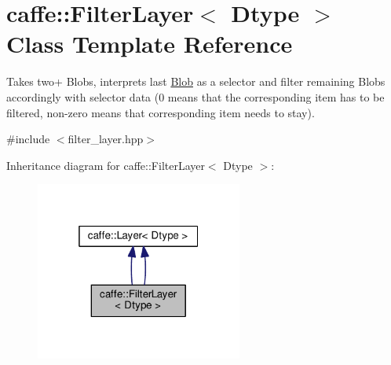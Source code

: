 \hypertarget{classcaffe_1_1_filter_layer}{}\section{caffe\+:\+:Filter\+Layer$<$ Dtype $>$ Class Template Reference}
\label{classcaffe_1_1_filter_layer}


Takes two+ Blobs, interprets last \mbox{\hyperlink{classcaffe_1_1_blob}{Blob}} as a selector and filter remaining Blobs accordingly with selector data (0 means that the corresponding item has to be filtered, non-\/zero means that corresponding item needs to stay).  




{\ttfamily \#include $<$filter\+\_\+layer.\+hpp$>$}



Inheritance diagram for caffe\+:\+:Filter\+Layer$<$ Dtype $>$\+:
\nopagebreak
\begin{figure}[H]
\begin{center}
\leavevmode
\includegraphics[width=193pt]{classcaffe_1_1_filter_layer__inherit__graph}
\end{center}
\end{figure}
